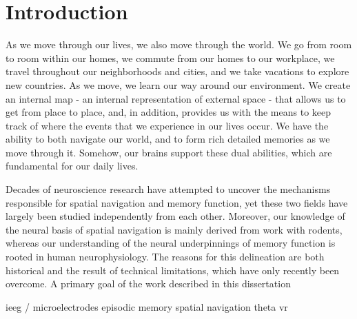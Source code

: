 \chapter{Introduction}



%
%
%

As we move through our lives, we also move through the world. We go from room to room within our homes, we commute from our homes to our workplace, we travel throughout our neighborhoods and cities, and we take vacations to explore new countries. As we move, we learn our way around our environment. We create an internal map - an internal representation of external space - that allows us to get from place to place, and, in addition, provides us with the means to keep track of where the events that we experience in our lives occur. We have the ability to both navigate our world, and to form rich detailed memories as we move through it. Somehow, our brains support these dual abilities, which are fundamental for our daily lives.

Decades of neuroscience research have attempted to uncover the mechanisms responsible for spatial navigation and memory function, yet these two fields have largely been studied independently from each other. Moreover, our knowledge of the neural basis of spatial navigation is mainly derived from work with rodents, whereas our understanding of the neural underpinnings of memory function is rooted in human neurophysiology. The reasons for this delineation are both historical and the result of technical limitations, which have only recently been overcome. A primary goal of the work described in this dissertation 

ieeg / microelectrodes
episodic memory
spatial navigation
theta
vr




%
%
%


